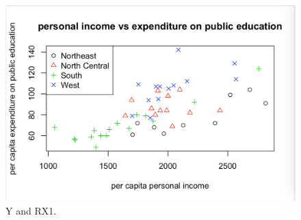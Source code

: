 \documentclass[12pt,letterpaper]{article}
\begin{document}
\begin{itemize}
		\begin{figure}	
			\includegraphics[width=\linewidth]{YRX1}
			\caption{Y and RX1.}
			\label{fig:YRX1}
		\end{figure}
		
		
		
		
	\end{itemize}
	
\end{document}
